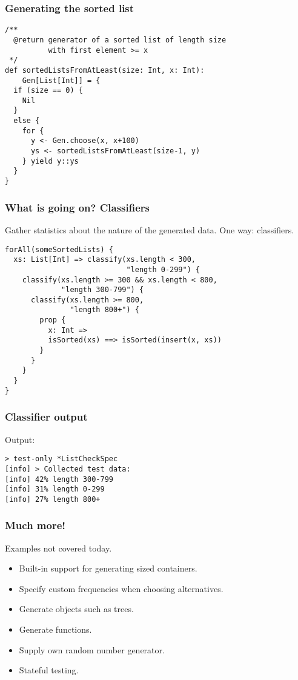 \begin{frame}[fragile]
  \frametitle{Generating the sorted list}

  \begin{verbatim}
/**
  @return generator of a sorted list of length size
          with first element >= x
 */
def sortedListsFromAtLeast(size: Int, x: Int):
    Gen[List[Int]] = {
  if (size == 0) {
    Nil
  }
  else {
    for {
      y <- Gen.choose(x, x+100)
      ys <- sortedListsFromAtLeast(size-1, y)
    } yield y::ys
  }
}
  \end{verbatim}
\end{frame}

\begin{frame}[fragile]
  \frametitle{What is going on? Classifiers}

  Gather statistics about the nature of the generated data. One way: classifiers.

  \begin{verbatim}
forAll(someSortedLists) {
  xs: List[Int] => classify(xs.length < 300,
                            "length 0-299") {
    classify(xs.length >= 300 && xs.length < 800,
             "length 300-799") {
      classify(xs.length >= 800,
               "length 800+") {
        prop {
          x: Int =>
          isSorted(xs) ==> isSorted(insert(x, xs))
        }
      }
    }
  }
}
  \end{verbatim}
\end{frame}

\begin{frame}[fragile]
  \frametitle{Classifier output}

  Output:
  \begin{verbatim}
> test-only *ListCheckSpec
[info] > Collected test data: 
[info] 42% length 300-799
[info] 31% length 0-299
[info] 27% length 800+
  \end{verbatim}
\end{frame}

\begin{frame}[fragile]
  \frametitle{Much more!}

  Examples not covered today.

  \begin{itemize}
    \item<1-> Built-in support for generating sized containers.
    \item<2-> Specify custom frequencies when choosing alternatives.
    \item<3-> Generate objects such as trees.
    \item<4-> Generate functions.
    \item<5-> Supply own random number generator.
    \item<6-> Stateful testing.
  \end{itemize}
\end{frame}

